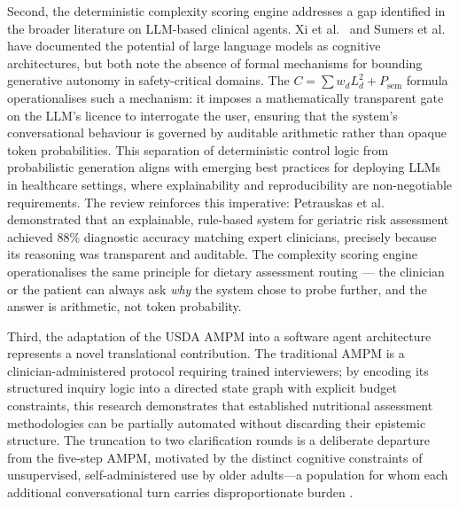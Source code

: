 Second, the deterministic complexity scoring engine addresses a gap identified in the broader literature on LLM-based clinical agents. Xi et al.\ \citep{xiRisePotentialLarge2025} and Sumers et al.\ \citep{sumersCognitiveArchitecturesLanguage2023} have documented the potential of large language models as cognitive architectures, but both note the absence of formal mechanisms for bounding generative autonomy in safety-critical domains. The $C = \sum w_d L_d^2 + P_{\text{sem}}$ formula operationalises such a mechanism: it imposes a mathematically transparent gate on the LLM's licence to interrogate the user, ensuring that the system's conversational behaviour is governed by auditable arithmetic rather than opaque token probabilities. This separation of deterministic control logic from probabilistic generation aligns with emerging best practices for deploying LLMs in healthcare settings, where explainability and reproducibility are non-negotiable requirements. The review reinforces this imperative: Petrauskas et al.\ \citep{petrauskasExplainableArtificialIntelligencebased2021} demonstrated that an explainable, rule-based system for geriatric risk assessment achieved $88\%$ diagnostic accuracy matching expert clinicians, precisely because its reasoning was transparent and auditable. The complexity scoring engine operationalises the same principle for dietary assessment routing --- the clinician or the patient can always ask \emph{why} the system chose to probe further, and the answer is arithmetic, not token probability.

Third, the adaptation of the USDA AMPM \citep{moshfeghUSDepartmentAgriculture2008} into a software agent architecture represents a novel translational contribution. The traditional AMPM is a clinician-administered protocol requiring trained interviewers; by encoding its structured inquiry logic into a directed state graph with explicit budget constraints, this research demonstrates that established nutritional assessment methodologies can be partially automated without discarding their epistemic structure. The truncation to two clarification rounds is a deliberate departure from the five-step AMPM, motivated by the distinct cognitive constraints of unsupervised, self-administered use by older adults---a population for whom each additional conversational turn carries disproportionate burden \citep{wildenbosAgingBarriersInfluencing2018}.

